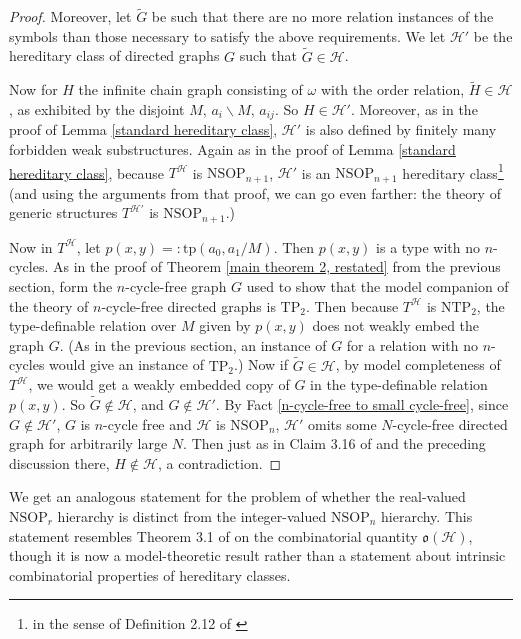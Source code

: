 \documentclass{amsart}
\theoremstyle{definition}
\theoremstyle{remark}
\numberwithin{equation}{section}
\begin{document}
\begin{proof}
Moreover, let $\tilde{G}$ be such that there are no more relation instances of the symbols than those necessary to satisfy the above requirements. We let $\mathcal{H}'$ be the hereditary class of directed graphs $G$ such that $\tilde{G} \in \mathcal{H}$. 

Now for $H$ the infinite chain graph consisting of $\omega$ with the order relation, $\tilde{H} \in \mathcal{H}$, as exhibited by the disjoint $M$, $a_{i}\backslash M$, $a_{ij}$. So $H \in \mathcal{H}'$. Moreover, as in the proof of Lemma \ref{standard hereditary class}, $\mathcal{H}'$ is also defined by finitely many forbidden weak substructures. Again as in the proof of Lemma \ref{standard hereditary class}, because $T^{\mathcal{H}}$ is $\mathrm{NSOP}_{n+1}$, $\mathcal{H}'$ is an $\mathrm{NSOP}_{n+1}$ hereditary class\footnote{in the sense of Definition 2.12 of \cite{ApproxOrder}} (and using the arguments from that proof, we can go even farther: the theory of generic structures $T^{\mathcal{H}'}$ is $\mathrm{NSOP}_{n+1}$.)

Now in $T^{\mathcal{H}}$, let $p(x, y) =: \mathrm{tp}(a_{0}, a_{1}/M)$. Then $p(x, y)$ is a type with no $n$-cycles. As in the proof of Theorem \ref{main theorem 2, restated} from the previous section, form the $n$-cycle-free graph $G$ used to show that the model companion of the theory of $n$-cycle-free directed graphs is $\mathrm{TP}_{2}$. Then because $T^{\mathcal{H}}$ is $\mathrm{NTP}_{2}$, the type-definable relation over $M$ given by $p(x, y)$ does not weakly embed the graph $G$. (As in the previous section, an instance of $G$ for a relation with no $n$-cycles would give an instance of $\mathrm{TP}_{2}$.) Now if $\tilde{G} \in \mathcal{H}$, by model completeness of $T^{\mathcal{H}}$, we would get a weakly embedded copy of $G$ in the type-definable relation $p(x, y)$. So $\tilde{G} \notin \mathcal{H}$, and $G \notin \mathcal{H}'$. By Fact \ref{n-cycle-free to small cycle-free}, since $G \notin \mathcal{H}'$, $G$ is $n$-cycle free and $\mathcal{H}$ is $\mathrm{NSOP}_{n}$, $\mathcal{H}'$ omits some $N$-cycle-free directed graph for arbitrarily large $N$. Then just as in Claim 3.16 of \cite{ApproxOrder} and the preceding discussion there, $H \notin \mathcal{H}$, a contradiction.

\end{proof}

We get an analogous statement for the problem of whether the real-valued $\mathrm{NSOP}_{r}$ hierarchy is distinct from the integer-valued $\mathrm{NSOP}_{n}$ hierarchy. This statement resembles Theorem 3.1 of \cite{ApproxOrder} on the combinatorial quantity $\mathfrak{o}(\mathcal{H})$, though it is now a model-theoretic result rather than a statement about intrinsic combinatorial properties of hereditary classes.
\end{document}

